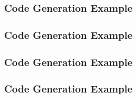 \begin{frame}
  \frametitle{Code Generation Example}
  \scriptsize
  
\end{frame}

\begin{frame}
  \frametitle{Code Generation Example}
  \scriptsize
  
\end{frame}

\begin{frame}
  \frametitle{Code Generation Example}
  \tiny
  
\end{frame}

\begin{frame}
  \frametitle{Code Generation Example}
  \scriptsize
  
\end{frame}
